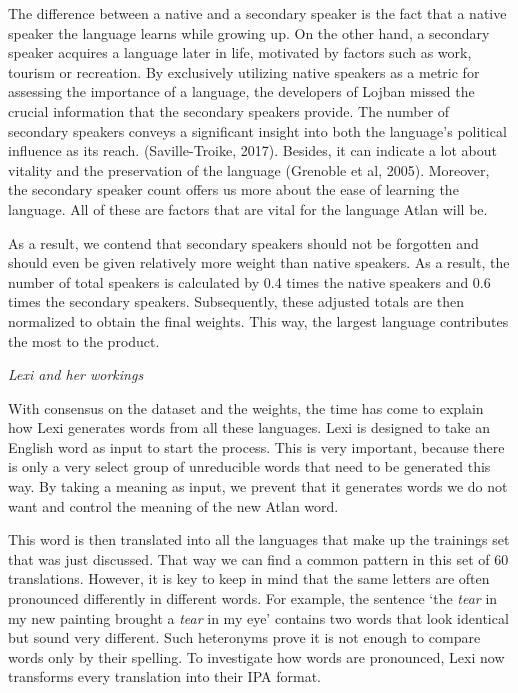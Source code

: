 The difference between a native and a secondary speaker is the fact that a native speaker the language learns while growing up. On the other hand, a secondary speaker acquires a language later in life, motivated by factors such as work, tourism or recreation. By exclusively utilizing native speakers as a metric for assessing the importance of a language, the developers of Lojban missed the crucial information that the secondary speakers provide. The number of secondary speakers conveys a significant insight into both the language's political influence as its reach. (Saville-Troike, 2017). Besides, it can indicate a lot about vitality and the preservation of the language (Grenoble et al, 2005). Moreover, the secondary speaker count offers us more about the ease of learning the language. All of these are factors that are vital for the language Atlan will be. 

As a result, we contend that secondary speakers should not be forgotten and should even be given relatively more weight than native speakers. As a result, the number of total speakers is calculated by 0.4 times the native speakers and 0.6 times the secondary speakers. Subsequently, these adjusted totals are then normalized to obtain the final weights. This way, the largest language contributes the most to the product. 

\noindent \textit{Lexi and her workings} 

\noindent With consensus on the dataset and the weights, the time has come to explain how Lexi generates words from all these languages. Lexi is designed to take an English word as input to start the process. This is very important, because there is only a very select group of unreducible words that need to be generated this way. By taking a meaning as input, we prevent that it generates words we do not want and control the meaning of the new Atlan word. 

This word is then translated into all the languages that make up the trainings set that was just discussed. That way we can find a common pattern in this set of 60 translations. However, it is key to keep in mind that the same letters are often pronounced differently in different words. For example, the sentence ‘the \textit{tear} in my new painting brought a \textit{tear} in my eye’ contains two words that look identical but sound very different. Such heteronyms prove it is not enough to compare words only by their spelling. To investigate how words are pronounced, Lexi now transforms every translation into their IPA format. 

